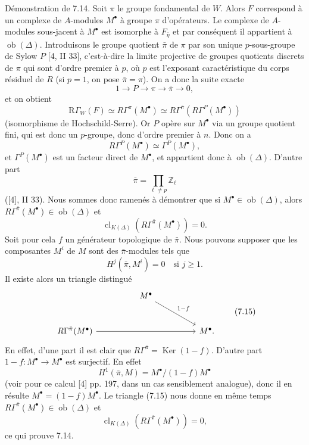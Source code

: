 \documentclass[11pt]{article}
\providecommand{\Ker}{\operatorname{Ker}}
\providecommand{\Ob}{\operatorname{ob}}
\providecommand{\Ker}{\operatorname{Ker}}
\providecommand{\Ker}{\operatorname{Ker}}
\providecommand{\Ob}{\operatorname{ob}}
\providecommand{\Ob}{\operatorname{Ob}}
\providecommand{\clK}[1]{\operatorname{cl}_{K(#1)}}
\providecommand{\RG}{\mathrm R\Gamma}
\providecommand{\Ob}{\operatorname{ob}}
\begin{document}
Démonstration de 7.14. Soit $\pi$ le groupe fondamental de $W$. Alors $F$ correspond à un complexe de $A$-modules $M^\bullet$ à groupe $\pi$ d'opérateurs. Le complexe de $A$-modules sous-jacent à $M^\bullet$ est isomorphe à $F_{\bar\eta}$ et par conséquent il appartient à $\Ob(\Delta)$. Introduisons le groupe quotient $\bar\pi$ de $\pi$ par son unique $p$-sous-groupe de Sylow $P$ [4, II 33], c'est-à-dire la limite projective de groupes quotients discrets de $\pi$ qui sont d'ordre premier à $p$, où $p$ est l'exposant caractéristique du corps résiduel de $R$ (si $p=1$, on pose $\bar\pi=\pi$). On a donc la suite exacte
\[
1\longrightarrow P\longrightarrow \pi\longrightarrow \bar\pi\longrightarrow0,
\]
et on obtient
\[
\RG_W(F)\simeq R\Gamma^\pi(M^\bullet)
\simeq R\Gamma^{\bar\pi}(R\Gamma^P(M^\bullet))
\]
(isomorphisme de Hochschild-Serre). Or $P$ opère sur $M^\bullet$ via un groupe quotient fini, qui est donc un $p$-groupe, donc d'ordre premier à $n$. Donc on a
\[
R\Gamma^P(M^\bullet)\simeq \Gamma^P(M^\bullet),
\]
et $\Gamma^P(M^\bullet)$ est un facteur direct de $M^\bullet$, et appartient donc à $\Ob(\Delta)$. D'autre part
\[
\bar\pi=\prod_{\ell\ne p}\mathbb Z_\ell
\]
([4], II 33). Nous sommes donc ramenés à démontrer que si $M^\bullet\in\Ob(\Delta)$, alors $R\Gamma^{\bar\pi}(M^\bullet)\in\Ob(\Delta)$ et
\[
\clK{\Delta}(R\Gamma^{\bar\pi}(M^\bullet))=0.
\]
Soit pour cela $f$ un générateur topologique de $\bar\pi$. Nous pouvons supposer que les composantes $M^i$ de $M$ sont des $\bar\pi$-modules tels que
\[
H^j(\bar\pi,M^i)=0\quad\text{si }j\ge1.
\]
Il existe alors un triangle distingué
\[
\begin{tikzcd}[column sep=huge,row sep=large]
& M^\bullet \arrow[dr,"1-f"] &\\
R\Gamma^{\bar\pi}(M^\bullet) \arrow[rr] && M^\bullet .
\end{tikzcd}
\tag{7.15}
\]
En effet, d'une part il est clair que $R\Gamma^{\bar\pi}=\Ker(1-f)$. D'autre part $1-f:M^\bullet\to M^\bullet$ est surjectif. En effet
\[
H^1(\bar\pi,M)=M^\bullet/(1-f)M^\bullet
\]
(voir pour ce calcul [4] pp. 197, dans un cas sensiblement analogue), donc il en résulte $M^\bullet=(1-f)M^\bullet$. Le triangle (7.15) nous donne en même temps $R\Gamma^{\bar\pi}(M^\bullet)\in\Ob(\Delta)$ et
\[
\clK{\Delta}(R\Gamma^{\bar\pi}(M^\bullet))=0,
\]
ce qui prouve 7.14.
\end{document}
